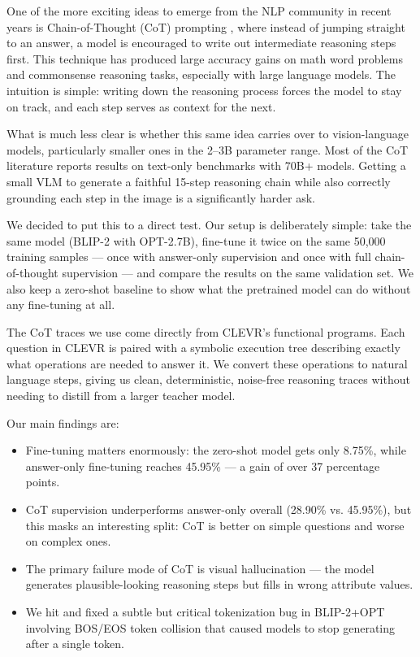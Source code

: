 \documentclass[11pt,twocolumn]{article}
\begin{document}
One of the more exciting ideas to emerge from the NLP community in recent years is Chain-of-Thought (CoT) prompting \cite{wei2022chain}, where instead of jumping straight to an answer, a model is encouraged to write out intermediate reasoning steps first. This technique has produced large accuracy gains on math word problems and commonsense reasoning tasks, especially with large language models. The intuition is simple: writing down the reasoning process forces the model to stay on track, and each step serves as context for the next.

What is much less clear is whether this same idea carries over to vision-language models, particularly smaller ones in the 2--3B parameter range. Most of the CoT literature reports results on text-only benchmarks with 70B+ models. Getting a small VLM to generate a faithful 15-step reasoning chain while also correctly grounding each step in the image is a significantly harder ask.

We decided to put this to a direct test. Our setup is deliberately simple: take the same model (BLIP-2 with OPT-2.7B), fine-tune it twice on the same 50,000 training samples — once with answer-only supervision and once with full chain-of-thought supervision — and compare the results on the same validation set. We also keep a zero-shot baseline to show what the pretrained model can do without any fine-tuning at all.

The CoT traces we use come directly from CLEVR's functional programs. Each question in CLEVR is paired with a symbolic execution tree describing exactly what operations are needed to answer it. We convert these operations to natural language steps, giving us clean, deterministic, noise-free reasoning traces without needing to distill from a larger teacher model.

Our main findings are:
\begin{itemize}
    \item Fine-tuning matters enormously: the zero-shot model gets only 8.75\%, while answer-only fine-tuning reaches 45.95\% — a gain of over 37 percentage points.
    \item CoT supervision underperforms answer-only overall (28.90\% vs. 45.95\%), but this masks an interesting split: CoT is better on simple questions and worse on complex ones.
    \item The primary failure mode of CoT is visual hallucination — the model generates plausible-looking reasoning steps but fills in wrong attribute values.
    \item We hit and fixed a subtle but critical tokenization bug in BLIP-2+OPT involving BOS/EOS token collision that caused models to stop generating after a single token.
\end{itemize}
\end{document}
